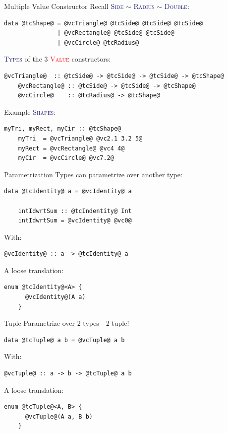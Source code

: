 \documentclass[xcolor={usenames,dvipsnames}]{beamer}
\newcommand{\htycon}[1]{\textcolor{MidnightBlue}{\textsc{#1}}}
\newcommand{\hvalcon}[1]{\textcolor{Red}{\textsc{#1}}}
\begin{document}
\begin{frame}[fragile]{Multiple Value Constructor}
  Recall \htycon{Side} $\sim$ \htycon{Radius} $\sim$ \htycon{Double}:
  \begin{lstlisting}[style=hask]
    data @tcShape@ = @vcTriangle@ @tcSide@ @tcSide@ @tcSide@
               | @vcRectangle@ @tcSide@ @tcSide@
               | @vcCircle@ @tcRadius@
  \end{lstlisting}

  \pause
  \htycon{Types} of the 3 \hvalcon{Value} constructors:
  \begin{lstlisting}[style=hask]
    @vcTriangle@  :: @tcSide@ -> @tcSide@ -> @tcSide@ -> @tcShape@
    @vcRectangle@ :: @tcSide@ -> @tcSide@ -> @tcShape@
    @vcCircle@    :: @tcRadius@ -> @tcShape@
  \end{lstlisting}

  \pause
  Example \htycon{Shapes}:
  \begin{lstlisting}[style=hask]
    myTri, myRect, myCir :: @tcShape@
    myTri  = @vcTriangle@ @vc2.1 3.2 5@
    myRect = @vcRectangle@ @vc4 4@
    myCir  = @vcCircle@ @vc7.2@
  \end{lstlisting}
\end{frame}

\begin{frame}[fragile]{Parametrization}
  Types can parametrize over another type:
  \begin{lstlisting}[style=hask]
    data @tcIdentity@ a = @vcIdentity@ a

    intIdwrtSum :: @tcIndentity@ Int
    intIdwrtSum = @vcIdentity@ @vc0@
  \end{lstlisting}

  \pause
  With:
  \begin{lstlisting}[style=hask]
    @vcIdentity@ :: a -> @tcIdentity@ a
  \end{lstlisting}

  \pause
  A loose translation:
  \begin{lstlisting}[style=hask]
    enum @tcIdentity@<A> {
      @vcIdentity@(A a)
    }
  \end{lstlisting}
\end{frame}

\begin{frame}[fragile]{Tuple}
  Parametrize over 2 types - 2-tuple!
  \begin{lstlisting}[style=hask]
    data @tcTuple@ a b = @vcTuple@ a b
  \end{lstlisting}

  \pause
  With:
  \begin{lstlisting}[style=hask]
    @vcTuple@ :: a -> b -> @tcTuple@ a b
  \end{lstlisting}
  \pause

  A loose translation:
  \begin{lstlisting}[style=hask]
    enum @tcTuple@<A, B> {
      @vcTuple@(A a, B b)
    }
  \end{lstlisting}
\end{frame}
\end{document}
